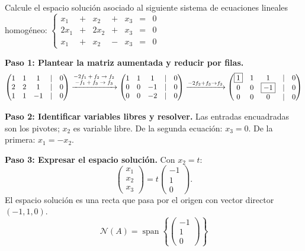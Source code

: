 \begin{example}
Calcule el espacio solución asociado al siguiente sistema de ecuaciones lineales homogéneo: \(\left\lbrace \begin{array}{ccccccc}
x_1&+&x_2&+&x_3&=&0\\
2x_1&+&2x_2&+&x_3&=&0\\
x_1&+&x_2&-&x_3&=&0
\end{array} \right. \)
\begin{myproof}
\textbf{Paso 1: Plantear la matriz aumentada y reducir por filas.}
\[\begin{pmatrix}
1&1&1&|&0\\
2&2&1&|&0\\
1&1&-1&|&0
\end{pmatrix}\xrightarrow{\begin{scriptsize}
\begin{matrix}
-2f_1+f_2 \rightarrow f_2\\ -f_1+f_3 \rightarrow f_3
\end{matrix}\end{scriptsize}}\begin{pmatrix}
1 & 1 & 1 & |& 0 \\
0 & 0 & -1 & |&0 \\
0 & 0 & -2 &|& 0
\end{pmatrix} \xrightarrow{-2f_2+f_3 \rightarrow f_3}\begin{pmatrix}
\boxed{1} & 1 & 1 & |& 0 \\
0 & 0 & \boxed{-1} & |&0 \\
0 & 0 & 0 &|& 0
\end{pmatrix}\]

\textbf{Paso 2: Identificar variables libres y resolver.} Las entradas encuadradas son los pivotes; $x_2$ es variable libre. De la segunda ecuación: $x_3=0$. De la primera: $x_1=-x_2$.

\textbf{Paso 3: Expresar el espacio solución.} Con $x_2=t$:
$$\begin{pmatrix} x_1\\x_2\\x_3 \end{pmatrix} = t\begin{pmatrix} -1\\1\\0 \end{pmatrix}.$$
El espacio solución es una recta que pasa por el origen con vector director $(-1,1,0)$.
$$\boxed{\mathcal{N}(A) = \operatorname{span}\!\left\{\begin{pmatrix}-1\\1\\0\end{pmatrix}\right\}}$$
\end{myproof}
\end{example}


